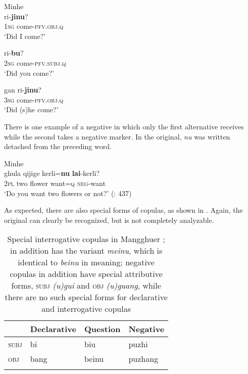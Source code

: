 \ea%
    \label{ex:mong:57}
    Minhe \\
    \ea
     {ri-}\textbf{{jinu}}?\\
    1\textsc{sg}  come-\textsc{pfv}.\textsc{obj}.\textsc{q}\\
    \glt ‘Did I come?’
    
    \ex
     {ri-}\textbf{{bu}}?\\
    2\textsc{sg}  come-\textsc{pfv}.\textsc{subj}.\textsc{q}\\
    \glt ‘Did you come?’
    
    \ex
    \gll gan  ri-\textbf{{jinu}}?\\
    3\textsc{sg}  come-\textsc{pfv}.\textsc{obj}.\textsc{q}\\
    \glt ‘Did (s)he come?’ \citep[198]{Slater2003a}\z\z

There is one example of a negative  in which only the first alternative receives  while the second takes a negative marker. In the original, \textit{nu} was written detached from the preceding word.

\ea%
    \label{ex:mong:58}
    Minhe \\
     {ghula} {qijige} {kerli}{=}\textbf{{nu}} \textbf{{lai}}{-kerli}?\\
    2\textsc{pl}  two  flower  want=\textsc{q}  \textsc{neg}-want\\
    \glt ‘Do you want two flowers or not?’ (\citealt{ZhuYongzhong1997}: 437)
    \z

As expected, there are also special  forms of copulas, as shown in . Again, the original  can clearly be recognized, but is not completely analyzable.

\begin{table}
\caption{Special interrogative copulas in Mangghuer \citep[318]{Slater2003b}; \citet[199]{Slater2003a} in addition has the variant \textit{meinu}, which is identical to \textit{beinu} in meaning; negative copulas in addition have special attributive forms, \textsc{subj} \textit{(u)gui} and \textsc{obj} \textit{(u)guang}, while there are no such special forms for declarative and interrogative copulas}
\label{tab:mong:10}

\begin{tabularx}{\textwidth}{XXXl}
\lsptoprule
& \textbf{Declarative} & \textbf{Question} & \textbf{Negative}\\
\midrule
\textsc{subj} & bi & biu & puzhi\\
\textsc{obj} & bang & beinu & puzhang\\
\lspbottomrule
\end{tabularx}
\end{table}

